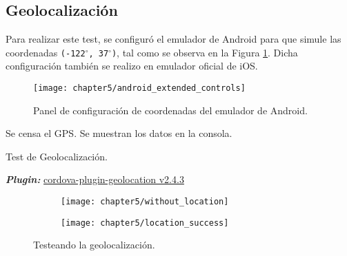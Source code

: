 \subsection{Geolocalización}
Para realizar este test, se configuró el emulador de Android para que simule las coordenadas \texttt{(-122$^\circ$, 37$^\circ$)}, tal como se observa en la Figura \ref{fig:ch05:android_extended_controls}. Dicha configuración también se realizo en emulador oficial de iOS.\\
\begin{figure}[hbtp]
    \centering
	\texttt{[image: chapter5/android\_extended\_controls]}
	\caption{Panel de configuración de coordenadas del emulador de Android.}
	\label{fig:ch05:android_extended_controls}
\end{figure}
\begin{algorithm}
	\begin{algorithmic}[1]
		\STATE Se censa el GPS.
		\STATE Se muestran los datos en la consola.
	\end{algorithmic}
	\caption{Test de Geolocalización.}\label{alg:chap5:test_geolocalizacion}
\end{algorithm}
\textbf{\emph{Plugin:}} \href{https://github.com/apache/cordova-plugin-geolocation}{cordova-plugin-geolocation v2.4.3}
\begin{figure}[hbtp]
    \centering
	\begin{subfigure}{0.3\linewidth}
		\texttt{[image: chapter5/without\_location]}
		\label{fig:ch05:without_location}
	\end{subfigure}
	\begin{subfigure}{0.3\linewidth}
		\texttt{[image: chapter5/location\_success]}
		\label{fig:ch05:with_location}
	\end{subfigure}
	\caption{Testeando la geolocalización.}
	\label{fig:ch05:geolocation-cases}
\end{figure}
\newpage
